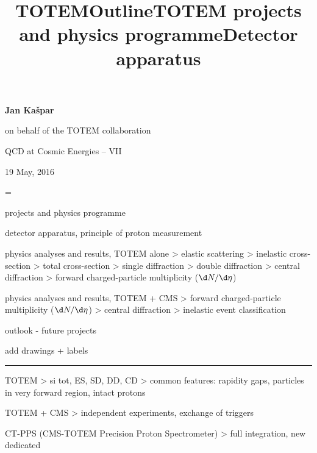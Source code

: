 


\newpage %

\def\author{Jan Kašpar}
\def\caption{QCD at Cosmic Energies -- VII}
\def\date{19 May, 2016}

\newpage %
\hbox{}\vfil
\title{TOTEM}
\vfil
\centerline{\bf Jan Kašpar}
\centerline{on behalf of the TOTEM collaboration}
\vfil
{}
\vfil
\centerline{\caption}
\centerline{\date}

\footline={}

\newpage %
\title{Outline}

\> projects and physics programme

\> detector apparatus, principle of proton measurement

\> physics analyses and results, TOTEM alone
\>> elastic scattering
\>> inelastic cross-section
\>> total cross-section
\>> single diffraction
\>> double diffraction
\>> central diffraction
\>> forward charged-particle multiplicity ($\d N/\d\eta$)

\> physics analyses and results, TOTEM + CMS
\>> forward charged-particle multiplicity ($\d N/\d\eta$)
\>> central diffraction
\>> inelastic event classification

\> outlook - future projects

\> 

\newpage %
\title{TOTEM projects and physics programme}

\> add drawings + labels

\hrule

\> TOTEM
\>> si tot, ES, SD, DD, CD
\>> common features: rapidity gaps, particles in very forward region, intact protons

\> TOTEM + CMS
\>> independent experiments, exchange of triggers

\> CT-PPS (CMS-TOTEM Precision Proton Spectrometer)
\>> full integration, new dedicated 


\newpage %
\title{Detector apparatus}

